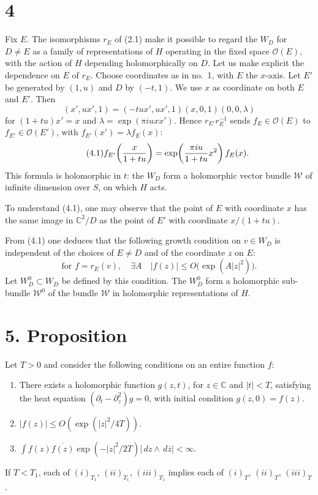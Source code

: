 \documentclass[11pt]{article}
\newcommand{\C}{\mathbb C}
\newcommand{\cO}{\mathcal O}
\newcommand{\cW}{\mathcal W}
\newcommand{\dd}{\,d}
\begin{document}
\section*{4}
Fix $E$. The isomorphisms $r_E$ of (2.1) make it possible to regard the $W_D$ for $D\ne E$ as a family of representations of $H$ operating in the fixed space $\cO(E)$, with the action of $H$ depending holomorphically on $D$. Let us make explicit the dependence on $E$ of $r_E$. Choose coordinates as in no.~1, with $E$ the $x$-axis. Let $E'$ be generated by $(1,u)$ and $D$ by $(-t,1)$. We use $x$ as coordinate on both $E$ and $E'$. Then
\[
(x',ux',1)=(-tux',ux',1)(x,0,1)(0,0,\lambda)
\]
for $(1+tu)x'=x$ and $\lambda=\exp(\pi iuxx')$. Hence $r_{E'}r_E^{-1}$ sends $f_E\in\cO(E)$ to $f_{E'}\in\cO(E')$, with $f_{E'}(x')=\lambda f_E(x)$:
\begin{equation}\tag{4.1}
f_{E'}\!\left({x\over 1+tu}\right)=\exp\!\left({\pi iu\over 1+tu}x^2\right)f_E(x).
\end{equation}
This formula is holomorphic in $t$: the $W_D$ form a holomorphic vector bundle $\cW$ of infinite dimension over $S$, on which $H$ acts.

To understand (4.1), one may observe that the point of $E$ with coordinate $x$ has the same image in $\C^2/D$ as the point of $E'$ with coordinate $x/(1+tu)$.

From (4.1) one deduces that the following growth condition on $v\in W_D$ is independent of the choices of $E\ne D$ and of the coordinate $z$ on $E$:
\begin{equation}\tag{4.2}
\text{for } f=r_E(v),\quad \exists A\quad |f(z)|\le O\bigl(\exp(A|z|^2)\bigr).
\end{equation}
Let $W_D^0\subset W_D$ be defined by this condition. The $W_D^0$ form a holomorphic sub-bundle $\cW^0$ of the bundle $\cW$ in holomorphic representations of $H$.

\section*{5. Proposition}
Let $T>0$ and consider the following conditions on an entire function $f$:
\begin{enumerate}[label=(\roman*)$_T$]
\item There exists a holomorphic function $g(z,t)$, for $z\in\C$ and $|t|<T$, satisfying the heat equation $(\partial_t-\partial_z^2)g=0$, with initial condition $g(z,0)=f(z)$.
\item $|f(z)|\le O(\exp(|z|^2/4T))$.
\item $\displaystyle \int f(z)\overline{f(z)}\exp(-|z|^2/2T)|\dd z\wedge \dd\overline z|<\infty$.
\end{enumerate}
If $T<T_1$, each of $(i)_{T_1}$, $(ii)_{T_1}$, $(iii)_{T_1}$ implies each of $(i)_T$, $(ii)_T$, $(iii)_T$.
\end{document}
